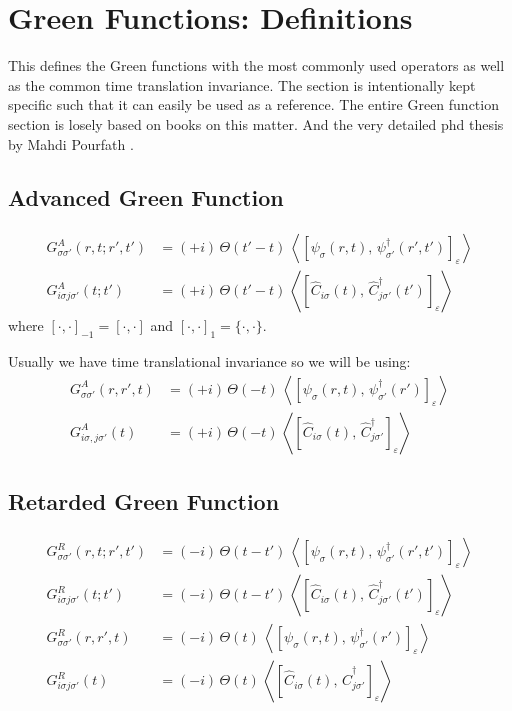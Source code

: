 \section{Green Functions: Definitions}
This defines the Green functions with the most commonly used operators as well as
the common time translation invariance. The section is intentionally kept specific such that it 
can easily be used as a reference. The entire Green function section is losely based on books on this matter. \cite{bruus_flensberg_many-body_2002}\cite{mahan_many-particle_2000}\cite{rickayzen_green_1980}
And the very detailed phd thesis by Mahdi Pourfath \cite{mahdi_2007}.

\subsection*{Advanced Green Function}
\begin{align}
    G^{A}_{\sigma\sigma'}(r,t;r',t') &= (+i)\, \Theta(t'-t)\, \left\langle \left[ \psi_{\sigma}(r,t),\, \psi_{\sigma'}^{\dagger}(r',t') \right]_{\varepsilon} \right\rangle \\[1ex]
    G^{A}_{i\sigma j\sigma'}(t;t') &= (+i)\, \Theta(t'-t)\, \left\langle \left[ \hat{C}_{i\sigma}(t),\, \hat{C}_{j\sigma'}^{\dagger}(t') \right]_{\varepsilon} \right\rangle
\end{align}
where $[\cdot,\cdot]_{-1} = [\cdot,\cdot]$ and $[\cdot,\cdot]_{1} = \{\cdot,\cdot\}$.

Usually we have time translational invariance so we will be using:
\begin{align}
    G^{A}_{\sigma\sigma'}(r,r',t) &= (+i)\, \Theta(-t)\, \left\langle \left[ \psi_{\sigma}(r,t),\, \psi_{\sigma'}^{\dagger}(r') \right]_{\varepsilon} \right\rangle \\[1ex]
    G^{A}_{i\sigma,j\sigma'}(t) &= (+i)\, \Theta(-t)\, \left\langle \left[ \hat{C}_{i\sigma}(t),\, \hat{C}_{j\sigma'}^{\dagger} \right]_{\varepsilon} \right\rangle
\end{align}

\subsection*{Retarded Green Function}
\begin{align}
    G^{R}_{\sigma\sigma'}(r,t;r',t') &= (-i)\, \Theta(t-t')\, \left\langle \left[ \psi_{\sigma}(r,t),\, \psi_{\sigma'}^{\dagger}(r',t') \right]_{\varepsilon} \right\rangle \\[1ex]
    G^{R}_{i\sigma j\sigma'}(t;t') &= (-i)\, \Theta(t-t')\, \left\langle \left[ \hat{C}_{i\sigma}(t),\, \hat{C}_{j\sigma'}^{\dagger}(t') \right]_{\varepsilon} \right\rangle \\[1ex]
    G^{R}_{\sigma\sigma'}(r,r',t) &= (-i)\, \Theta(t)\, \left\langle \left[ \psi_{\sigma}(r,t),\, \psi_{\sigma'}^{\dagger}(r') \right]_{\varepsilon} \right\rangle \\[1ex]
    G^{R}_{i\sigma j\sigma'}(t) &= (-i)\, \Theta(t)\, \left\langle \left[ \hat{C}_{i\sigma}(t),\, \hat{C}_{j\sigma'}^{\dagger} \right]_{\varepsilon} \right\rangle \label{eq:retarded-green-tti}
\end{align}

